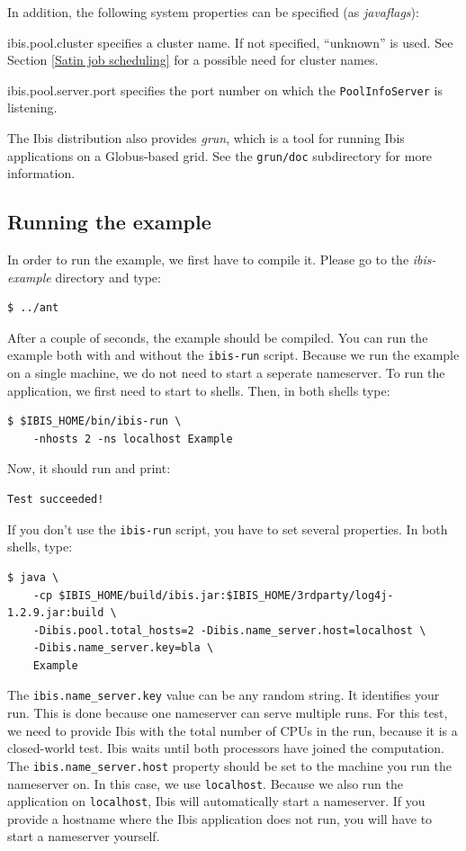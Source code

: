 \documentclass[10pt]{article}
\newcommand{\mysubsection}[1]{\subsection{#1}\label{#1}}
\begin{document}
In addition, the following system properties can be specified
(as \emph{javaflags}):
\begin{description}
\item{ibis.pool.cluster}
specifies a cluster name. If not specified,
``unknown'' is used.
See Section \ref{Satin job scheduling} for a possible need for cluster
names.
\item{ibis.pool.server.port}
specifies the port number on which the
\texttt{PoolInfoServer} is listening.
\end{description}

The Ibis distribution also provides \emph{grun}, which is a tool for
running Ibis applications on a Globus-based grid. See the
\texttt{grun/doc} subdirectory for more information.

\mysubsection{Running the example}
In order to run the example, we first have to compile it.
Please go to the \emph{ibis-example} directory and type:
\noindent
\begin{verbatim}
$ ../ant
\end{verbatim}
\noindent
After a couple of seconds, the example should be compiled.
You can run the example both with and without the \texttt{ibis-run} script.
Because we run the example on a single machine, we do not need to start a seperate nameserver.
To run the application, we first need to start to shells.
Then, in both shells type:
\begin{verbatim}
$ $IBIS_HOME/bin/ibis-run \
    -nhosts 2 -ns localhost Example
\end{verbatim}
\noindent
Now, it should run and print:
\begin{verbatim}
Test succeeded!
\end{verbatim}
\noindent
If you don't use the \texttt{ibis-run} script, you have to set several properties.
In both shells, type:
\begin{verbatim}
$ java \
    -cp $IBIS_HOME/build/ibis.jar:$IBIS_HOME/3rdparty/log4j-1.2.9.jar:build \
    -Dibis.pool.total_hosts=2 -Dibis.name_server.host=localhost \
    -Dibis.name_server.key=bla \
    Example
\end{verbatim}
\noindent
The \texttt{ibis.name\_server.key} value can be any random string.
It identifies your run.
This is done because one nameserver can serve multiple
runs. For this test, we need to provide Ibis with the total number of
CPUs in the run, because it is a closed-world test. Ibis waits until
both processors have joined the computation.
The \texttt{ibis.name\_server.host} property should
be set to the machine you run the nameserver on.  In this case, we use
\texttt{localhost}.
Because we also run the application on \texttt{localhost}, Ibis will
automatically start a nameserver. If you provide a hostname where the
Ibis application does not run, you will have to start a nameserver
yourself.
\end{document}
